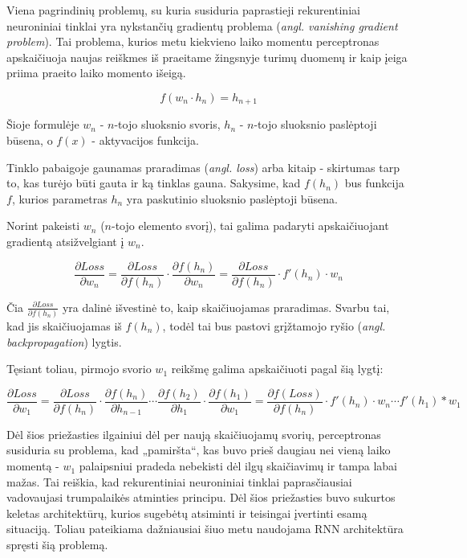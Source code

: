 \documentclass{VUMIFPSbakalaurinis}
\begin{document}
Viena pagrindinių problemų, su kuria susiduria paprastieji rekurentiniai neuroniniai tinklai yra nykstančių gradientų problema (\textit{angl. vanishing gradient problem}). Tai problema, kurios metu kiekvieno laiko momentu perceptronas apskaičiuoja naujas reiškmes iš praeitame žingsnyje turimų duomenų ir kaip įeiga priima praeito laiko momento išeigą. 

\begin{equation}
	f(w_n \cdot h_n)=h_{n+1}
\end{equation}

Šioje formulėje $w_n$ - $n$-tojo sluoksnio svoris, $h_n$ - $n$-tojo sluoksnio paslėptoji būsena, o $f(x)$ - aktyvacijos funkcija.

Tinklo pabaigoje gaunamas praradimas (\textit{angl. loss}) arba kitaip - skirtumas tarp to, kas turėjo būti gauta ir ką tinklas gauna. Sakysime, kad $f(h_n)$ bus funkcija $f$, kurios parametras $h_n$ yra paskutinio sluoksnio paslėptoji būsena.

Norint pakeisti $w_n$ ($n$-tojo elemento svorį), tai galima padaryti apskaičiuojant gradientą atsižvelgiant į $w_n$.

\begin{equation}
	\frac{\partial Loss}{\partial w_n} = \frac{\partial Loss}{\partial f(h_n)} \cdot \frac{\partial f(h_n)}{\partial w_n} = \frac{\partial Loss}{\partial f(h_n)} \cdot f'(h_n) \cdot w_n
\end{equation}

Čia $\frac{\partial Loss}{\partial f(h_n)}$ yra dalinė išvestinė to, kaip skaičiuojamas praradimas. Svarbu tai, kad jis skaičiuojamas iš $f(h_n)$, todėl tai bus pastovi grįžtamojo ryšio (\textit{angl. backpropagation}) lygtis.

Tęsiant toliau, pirmojo svorio $w_1$ reikšmę galima apskaičiuoti pagal šią lygtį:

\begin{equation}
\frac{\partial Loss}{\partial w_1} = \frac{\partial Loss}{\partial f(h_n)} \cdot \frac{\partial f(h_n)}{\partial h_{n-1}} \cdots \frac{\partial f(h_2)}{\partial h_1} \cdot \frac{\partial f(h_1)}{\partial w_1} = \frac{\partial f(Loss)}{\partial f(h_n)} \cdot f'(h_n) \cdot w_n \cdots f'(h_1) * w_1
\end{equation}

Dėl šios priežasties ilgainiui dėl per naują skaičiuojamų svorių, perceptronas susiduria su problema, kad „pamiršta“, kas buvo prieš daugiau nei vieną laiko momentą - $w_1$ palaipsniui pradeda nebekisti dėl ilgų skaičiavimų ir tampa labai mažas. Tai reiškia, kad rekurentiniai neuroniniai tinklai paprasčiausiai vadovaujasi trumpalaikės atminties principu. Dėl šios priežasties buvo sukurtos keletas architektūrų, kurios sugebėtų atsiminti ir teisingai įvertinti esamą situaciją. Toliau pateikiama dažniausiai šiuo metu naudojama RNN architektūra spręsti šią problemą.
\end{document}
